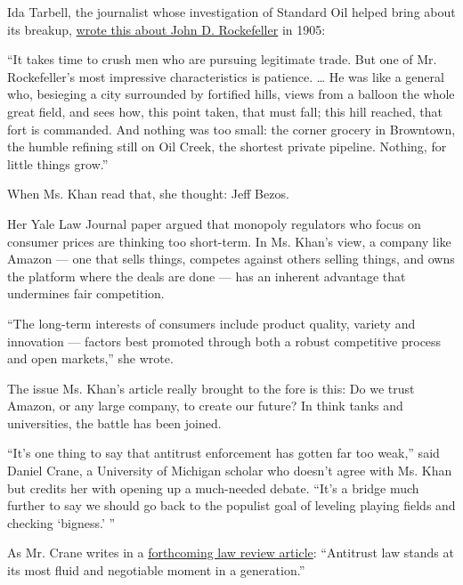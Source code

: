 Ida Tarbell, the journalist whose investigation of Standard Oil helped
bring about its breakup,
\href{http://www.reformation.org/mcclure-rockefeller.html}{wrote this
about John D. Rockefeller} in 1905:

``It takes time to crush men who are pursuing legitimate trade. But one
of Mr. Rockefeller's most impressive characteristics is patience.
\ldots{} He was like a general who, besieging a city surrounded by
fortified hills, views from a balloon the whole great field, and sees
how, this point taken, that must fall; this hill reached, that fort is
commanded. And nothing was too small: the corner grocery in Browntown,
the humble refining still on Oil Creek, the shortest private pipeline.
Nothing, for little things grow.''

When Ms. Khan read that, she thought: Jeff Bezos.

Her Yale Law Journal paper argued that monopoly regulators who focus on
consumer prices are thinking too short-term. In Ms. Khan's view, a
company like Amazon --- one that sells things, competes against others
selling things, and owns the platform where the deals are done --- has
an inherent advantage that undermines fair competition.

``The long-term interests of consumers include product quality, variety
and innovation --- factors best promoted through both a robust
competitive process and open markets,'' she wrote.

The issue Ms. Khan's article really brought to the fore is this: Do we
trust Amazon, or any large company, to create our future? In think tanks
and universities, the battle has been joined.

``It's one thing to say that antitrust enforcement has gotten far too
weak,'' said Daniel Crane, a University of Michigan scholar who doesn't
agree with Ms. Khan but credits her with opening up a much-needed
debate. ``It's a bridge much further to say we should go back to the
populist goal of leveling playing fields and checking `bigness.' ''

As Mr. Crane writes in a
\href{https://repository.law.umich.edu/cgi/viewcontent.cgi?article=1264\&amp=\&context=law_econ_current\&amp=\&sei-redir=1\&referer=https\%253A\%252F\%252Fwww.google.com\%252Furl\%253Fq\%253Dhttps\%253A\%252F\%252Frepository.law.umich.edu\%252Fcgi\%252Fviewcontent.cgi\%253Farticle\%25253D1264\%252526context\%25253Dlaw_econ_current\%2526sa\%253DD\%2526source\%253Dhangouts\%2526ust\%253D1536207313850000\%2526usg\%253DAFQjCNE_HOt_Sn9-tVjtGaIY6BmPZlkpeA\#search=\%22https\%3A\%2F\%2Frepository.law.umich.edu\%2Fcgi\%2Fviewcontent.cgi\%3Farticle\%3D1264\%26context\%3Dlaw_econ_current\%22}{forthcoming
law review article}: ``Antitrust law stands at its most fluid and
negotiable moment in a generation.''

